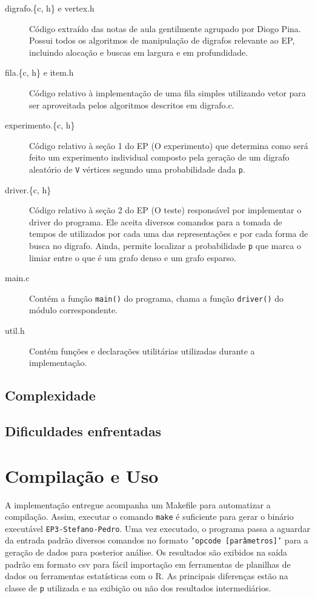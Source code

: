 \documentclass[brazil,times]{abnt}
\begin{document}
\begin{description}
	\item[digrafo.\{c, h\} e vertex.h] Código extraído das notas de aula gentilmente agrupado por Diogo Pina. Possui todos os algoritmos de manipulação de digrafos relevante ao EP, incluindo alocação e buscas em largura e em profundidade.
	\item[fila.\{c, h\} e item.h] Código relativo à implementação de uma fila simples utilizando vetor para ser aproveitada pelos algoritmos descritos em digrafo.c.
	\item[experimento.\{c, h\}] Código relativo à seção 1 do EP (O experimento) que determina como será feito um experimento individual composto pela geração de um digrafo aleatório de \texttt{V} vértices segundo uma probabilidade dada \texttt{p}.
	\item[driver.\{c, h\}] Código relativo à seção 2 do EP (O teste) responsável por implementar o driver do programa. Ele aceita diversos comandos para a tomada de tempos de utilizados por cada uma das representações e por cada forma de busca no digrafo. Ainda, permite localizar a probabilidade \texttt{p} que marca o limiar entre o que é um grafo denso e um grafo esparso.
	\item[main.c] Contém a função \texttt{main()} do programa, chama a função \texttt{driver()} do módulo correspondente.
	\item[util.h] Contém funções e declarações utilitárias utilizadas durante a implementação.
\end{description}


\subsection*{Complexidade}

\subsection*{Dificuldades enfrentadas}


\section*{Compilação e Uso}
A implementação entregue acompanha um Makefile para automatizar a compilação. Assim, executar o comando \texttt{make} é suficiente para gerar o binário executável \texttt{EP3-Stefano-Pedro}. Uma vez executado, o programa passa a aguardar da entrada padrão diversos comandos no formato \texttt{'opcode [parâmetros]'} para a geração de dados para posterior análise. Os resultados são exibidos na saída padrão em formato csv para fácil importação em ferramentas de planilhas de dados ou ferramentas estatísticas com o R. As principais diferenças estão na classe de \texttt{p} utilizada e na exibição ou não dos resultados intermediários.
\end{document}
